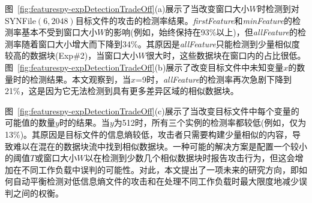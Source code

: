 图~\ref{fig:featurespy-expDetectionTradeOff}(a)展示了当改变窗口大小$W$时检测到对SYNFile$(6,2048)$目标文件的攻击的检测率结果。\textit{firstFeature}和\textit{minFeature}的检测率基本不受到窗口大小$W$的影响(例如，始终保持在93\%以上)，但\textit{allFeature}的检测率随着窗口大小增大而下降到34\%。其原因是\textit{allFeature}只能检测到少量相似度较高的数据块(Exp\#2)，当窗口大小$W$很大时，这些数据块在窗口内的占比很低。图~\ref{fig:featurespy-expDetectionTradeOff}(b)展示了改变目标文件中未知变量$x$的数量时的检测结果。本文观察到，当$x$=9时，\textit{allFeature}的检测率再次急剧下降到21\%，这是因为它无法检测到具有更多差异区域的相似数据块。

图~\ref{fig:featurespy-expDetectionTradeOff}(c)展示了当改变目标文件中每个变量的可能值的数量$y$时的结果。当$y$为512时，所有三个实例的检测率都较低(例如，仅为13\%)。其原因是目标文件的信息熵较低，攻击者只需要构建少量相似的内容，导致\sysnameF 难以在混在的数据块流中找到相似数据块。一种可能的解决方案是配置一个较小的阈值$T$或窗口大小$W$以在检测到少数几个相似数据块时报告攻击行为，但这会增加在不同工作负载中误判的可能性。对此，本文提出了一项未来的研究方向，即如何自动平衡检测对低信息熵文件的攻击和在处理不同工作负载时最大限度地减少误判之间的权衡。